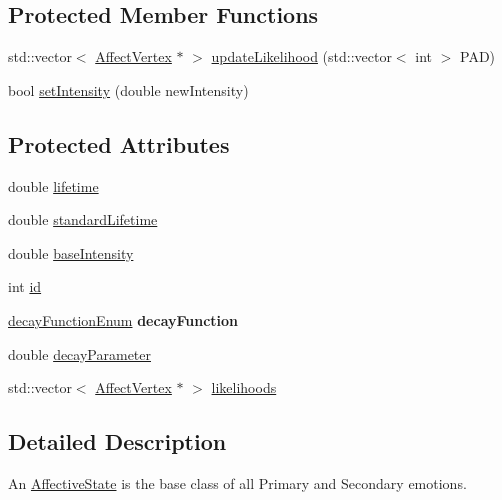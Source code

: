 \subsection*{\-Protected \-Member \-Functions}
\begin{DoxyCompactItemize}
\item 
std\-::vector$<$ \hyperlink{class_affect_vertex}{\-Affect\-Vertex} $\ast$ $>$ \hyperlink{class_affective_state_a6529b00f1d62e79c8db2d09d756f011a}{update\-Likelihood} (std\-::vector$<$ int $>$ \-P\-A\-D)
\item 
bool \hyperlink{class_affective_state_a952cec059138bd392c5897a18ed3b6cd}{set\-Intensity} (double new\-Intensity)
\end{DoxyCompactItemize}
\subsection*{\-Protected \-Attributes}
\begin{DoxyCompactItemize}
\item 
double \hyperlink{class_affective_state_ae067f508a2053daf7541bf0901e38b67}{lifetime}
\item 
double \hyperlink{class_affective_state_a081f3fff485d06a746b1b472adf3160c}{standard\-Lifetime}
\item 
double \hyperlink{class_affective_state_a3ab3863056c40d2bd2910642d5565dc6}{base\-Intensity}
\item 
int \hyperlink{class_affective_state_a5db5a1c7f76aba385d216010bcc74509}{id}
\item 
\hypertarget{class_affective_state_a670e6974b030651725a83b379f233711}{
\hyperlink{class_affective_state_aa47963a65353591a1e2109987ef624a1}{decay\-Function\-Enum} {\bfseries decay\-Function}}
\label{class_affective_state_a670e6974b030651725a83b379f233711}

\item 
double \hyperlink{class_affective_state_a80ee188d27e7b36c94ac9c1f9ddb3cb7}{decay\-Parameter}
\item 
std\-::vector$<$ \hyperlink{class_affect_vertex}{\-Affect\-Vertex} $\ast$ $>$ \hyperlink{class_affective_state_a7dedd88cae5c125dfedaaf2eb48ae01f}{likelihoods}
\end{DoxyCompactItemize}


\subsection{\-Detailed \-Description}
\-An \hyperlink{class_affective_state}{\-Affective\-State} is the base class of all \-Primary and \-Secondary emotions. 

